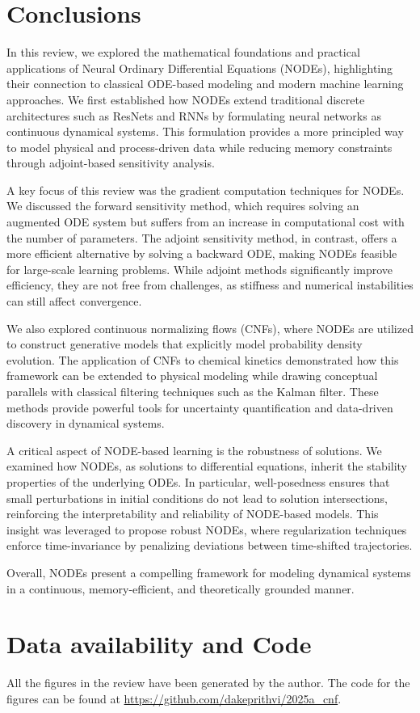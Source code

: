 \documentclass[fontsize=11pt]{article}
\theoremstyle{definition}
\begin{document}
\section{Conclusions}
In this review, we explored the mathematical foundations and practical applications 
of Neural Ordinary Differential Equations (NODEs), highlighting their connection 
to classical ODE-based modeling and modern machine learning approaches. We first 
established how NODEs extend traditional discrete architectures such as ResNets 
and RNNs by formulating neural networks as continuous dynamical systems. This 
formulation provides a more principled way to model physical and process-driven 
data while reducing memory constraints through adjoint-based sensitivity analysis.

A key focus of this review was the gradient computation techniques for NODEs. We 
discussed the forward sensitivity method, which requires solving an augmented ODE 
system but suffers from an increase in computational cost with the number of parameters. 
The adjoint sensitivity method, in contrast, offers a more efficient alternative by 
solving a backward ODE, making NODEs feasible for large-scale learning problems. While 
adjoint methods significantly improve efficiency, they are not free from challenges, 
as stiffness and numerical instabilities can still affect convergence.

We also explored continuous normalizing flows (CNFs), where NODEs are utilized to 
construct generative models that explicitly model probability density evolution. 
The application of CNFs to chemical kinetics demonstrated how this framework can 
be extended to physical modeling while drawing conceptual parallels with classical 
filtering techniques such as the Kalman filter. These methods provide powerful tools 
for uncertainty quantification and data-driven discovery in dynamical systems.

A critical aspect of NODE-based learning is the robustness of solutions. We examined 
how NODEs, as solutions to differential equations, inherit the stability properties 
of the underlying ODEs. In particular, well-posedness ensures that small perturbations 
in initial conditions do not lead to solution intersections, reinforcing the interpretability 
and reliability of NODE-based models. This insight was leveraged to propose robust NODEs, 
where regularization techniques enforce time-invariance by penalizing deviations between time-shifted trajectories.

Overall, NODEs present a compelling framework for modeling dynamical systems in a continuous, 
memory-efficient, and theoretically grounded manner. 

\section{Data availability and Code}
All the figures in the review have been generated by the author. The code for the
figures can be found at \url{https://github.com/dakeprithvi/2025a_cnf}. 

\newpage
\FloatBarrier


\end{document}
